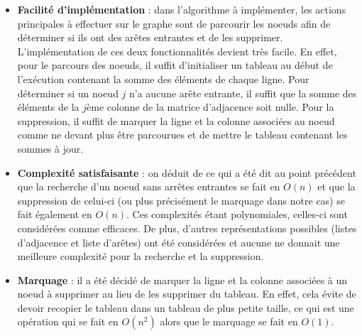 \begin{itemize}
\item \textbf{Facilité d'implémentation} : dans l'algorithme à implémenter, les actions principales à effectuer sur le graphe sont de parcourir les noeuds afin de déterminer si ils ont des arêtes entrantes et de les supprimer. L'implémentation de ces deux fonctionnalités devient très facile. En effet, pour le parcours des noeuds, il suffit d'initialiser un tableau au début de l'exécution contenant la somme des éléments de chaque ligne. Pour déterminer si un noeud $j$ n'a aucune arête entrante, il suffit que la somme des éléments de la $j$ème colonne de la matrice d'adjacence soit nulle. Pour la suppression, il suffit de marquer la ligne et la colonne associées au noeud comme ne devant plus être parcourues et de mettre le tableau contenant les sommes à jour.

\item \textbf{Complexité satisfaisante} : on déduit de ce qui a été dit au point précédent que la recherche d'un noeud sans arrêtes entrantes se fait en $O(n)$ et que la suppression de celui-ci (ou plus précisément le marquage dans notre cas) se fait également en $O(n)$. Ces complexités étant polynomiales, celles-ci sont considérées comme efficaces. De plus, d'autres représentations possibles (listes d'adjacence et liste d'arêtes) ont été considérées et aucune ne donnait une meilleure complexité pour la recherche et la suppression.

\item \textbf{Marquage} : il a été décidé de marquer la ligne et la colonne associées à un noeud à supprimer au lieu de les supprimer du tableau. En effet, cela évite de devoir recopier le tableau dans un tableau de plus petite taille, ce qui est une opération qui se fait en $O(n^2)$ alors que le marquage se fait en $O(1)$.
\end{itemize}

